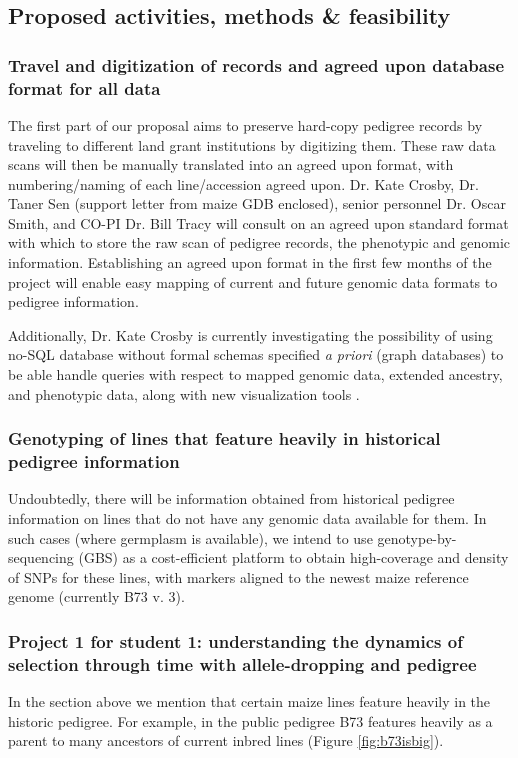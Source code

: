 \documentclass[12pt]{article}
\begin{document}
\subsection*{Proposed activities, methods \& feasibility}
\subsubsection*{Travel and digitization of records and agreed upon database format for all data}
The first part of our proposal aims to preserve hard-copy pedigree records by traveling to different land grant institutions by digitizing them. 
These raw data scans will then be manually translated into an agreed upon format, with numbering/naming of each line/accession agreed upon.
Dr. Kate Crosby, Dr. Taner Sen (support letter from maize GDB enclosed), senior personnel Dr. Oscar Smith, and CO-PI Dr. Bill Tracy will consult on an agreed upon standard format with which to store the raw scan of pedigree records, the phenotypic and genomic information. 
Establishing an agreed upon format in the first few months of the project will enable easy mapping of current and future genomic data formats to pedigree information.

Additionally, Dr. Kate Crosby is currently investigating the possibility of using no-SQL database without formal schemas specified \textit{a priori} (graph databases) to be able handle queries with respect to mapped genomic data, extended ancestry, and phenotypic data, along with new visualization tools \citep{ParejaTobes:2015bf}.

\subsubsection*{Genotyping of lines that feature heavily in historical pedigree information}
Undoubtedly, there will be information obtained from historical pedigree information on lines that do not have any genomic data available for them. 
In such cases (where germplasm is available), we intend to use genotype-by-sequencing (GBS) \citep{Elshire:2011ha} as a cost-efficient platform \citep{Glaubitz:2014eu} to obtain high-coverage and density of SNPs  for these lines, with markers aligned to the newest maize reference genome (currently B73 v. 3). 

\subsubsection*{Project 1 for student 1: understanding the dynamics of selection through time with allele-dropping and pedigree}
In the section above we mention that certain maize lines feature heavily in the historic pedigree. For example, in the public pedigree B73 features heavily as a parent to many ancestors of current inbred lines (Figure \ref{fig:b73isbig}). 
\end{document}
